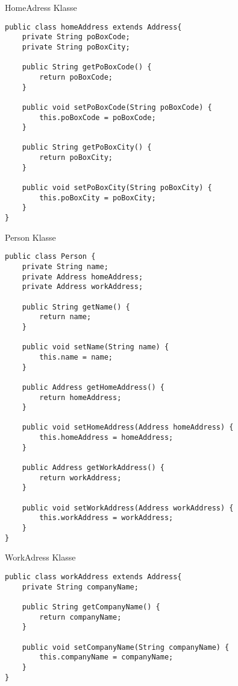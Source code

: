 \documentclass[12pt,a4paper,oneside,ngerman]{article}
\begin{document}
HomeAdress Klasse
\begin{lstlisting}
public class homeAddress extends Address{
    private String poBoxCode;
    private String poBoxCity;

    public String getPoBoxCode() {
        return poBoxCode;
    }

    public void setPoBoxCode(String poBoxCode) {
        this.poBoxCode = poBoxCode;
    }

    public String getPoBoxCity() {
        return poBoxCity;
    }

    public void setPoBoxCity(String poBoxCity) {
        this.poBoxCity = poBoxCity;
    }
}

\end{lstlisting}

Person Klasse
\begin{lstlisting}
public class Person {
    private String name;
    private Address homeAddress;
    private Address workAddress;

    public String getName() {
        return name;
    }

    public void setName(String name) {
        this.name = name;
    }

    public Address getHomeAddress() {
        return homeAddress;
    }

    public void setHomeAddress(Address homeAddress) {
        this.homeAddress = homeAddress;
    }

    public Address getWorkAddress() {
        return workAddress;
    }

    public void setWorkAddress(Address workAddress) {
        this.workAddress = workAddress;
    }
}

\end{lstlisting}

WorkAdress Klasse
\begin{lstlisting}
public class workAddress extends Address{
    private String companyName;

    public String getCompanyName() {
        return companyName;
    }

    public void setCompanyName(String companyName) {
        this.companyName = companyName;
    }
}
\end{lstlisting}
\end{document}
